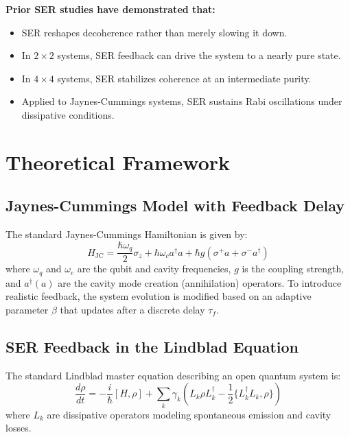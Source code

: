 \documentclass[a4paper,11pt]{article}
\begin{document}
\textbf{Prior SER studies have demonstrated that:}
\begin{itemize}
    \item SER reshapes decoherence rather than merely slowing it down.
    \item In $2\times2$ systems, SER feedback can drive the system to a nearly pure state.
    \item In $4\times4$ systems, SER stabilizes coherence at an intermediate purity.
    \item Applied to Jaynes-Cummings systems, SER sustains Rabi oscillations under dissipative conditions.
\end{itemize}

\section{Theoretical Framework}

\subsection{Jaynes-Cummings Model with Feedback Delay}
The standard Jaynes-Cummings Hamiltonian is given by:
\begin{equation}
H_{\text{JC}} =
\frac{\hbar \omega_q}{2} \sigma_z + \hbar \omega_c a^{\dagger} a + \hbar g (\sigma^+ a + \sigma^- a^{\dagger})
\end{equation}
where $\omega_q$ and $\omega_c$ are the qubit and cavity frequencies, $g$ is the coupling strength, and $a^{\dagger} (a)$ are the cavity mode creation (annihilation) operators. To introduce realistic feedback, the system evolution is modified based on an adaptive parameter $\beta$ that updates after a discrete delay $\tau_f$.

\subsection{SER Feedback in the Lindblad Equation}
The standard Lindblad master equation describing an open quantum system is:
\begin{equation}
\frac{d\rho}{dt} = -\frac{i}{\hbar} [H, \rho] + \sum_k \gamma_k \left( L_k \rho L_k^{\dagger} - \frac{1}{2} \{ L_k^{\dagger} L_k, \rho \} \right)
\end{equation}
where $L_k$ are dissipative operators modeling spontaneous emission and cavity losses.
\end{document}
